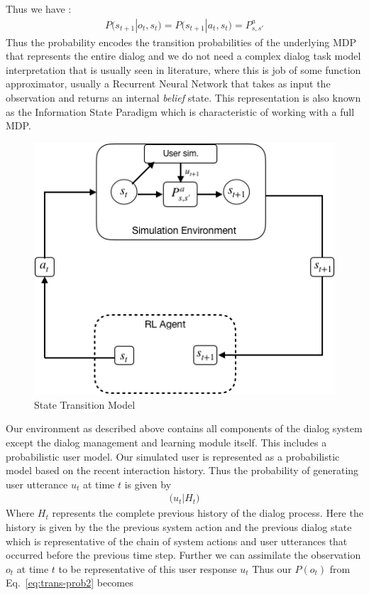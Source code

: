 \documentclass[14pt]{extarticle}
\numberwithin{equation}{section}
\begin{document}
	Thus we have :
	\begin{align}\label{eq:trans-prob2}
P\big(s_{t+1}|o_t, s_t\big)
 = P\big(s_{t+1} | a_t, s_t\big) = P_{s,s'}^a
\end{align}
Thus the probability encodes the transition probabilities of the underlying MDP that represents the entire dialog and we do not need a complex dialog task model interpretation that is usually seen in literature, where this is job of some function approximator, usually a Recurrent Neural Network that takes as input the observation and returns an internal \textit{belief} state. This representation is also known as the Information State Paradigm \cite{Larsson:2000:ISD:973935.973943} which is characteristic of working with a full MDP.
	\begin{figure}[h]
		\centering
		\includegraphics[scale=0.7]{state-trans}
		\caption{State Transition Model
			\label{state-trans}}
	\end{figure}
Our environment as described above contains all components of the dialog system except the dialog management and learning module itself. This includes a probabilistic user model. Our simulated user is represented as a probabilistic model based on the recent interaction history. Thus the probability of generating user utterance $u_t$ at time $t$ is given by 
\begin{align}
\big(u_t | H_t\big)
\end{align}
Where $H_t$ represents the complete previous history of the dialog process. Here the history is given by the the previous system action and the previous dialog state which is representative of the chain of system actions and user utterances that occurred before the previous time step. Further we can assimilate the observation $o_t$ at time $t$ to be representative of this user response $u_t$ Thus our $P(o_t)$ from Eq.\ \ref{eq:trans-prob2} becomes
\end{document}
